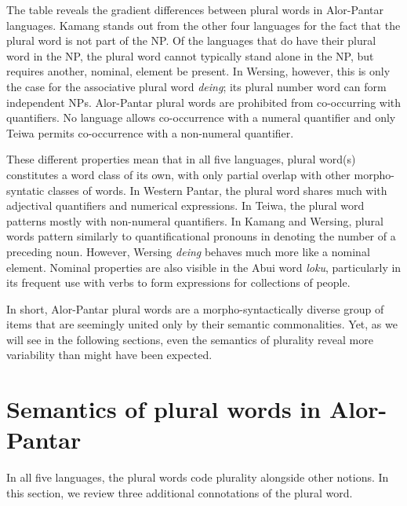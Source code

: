 The table reveals the gradient differences between plural words in Alor-Pantar languages. Kamang stands out from the other four languages for the fact that the plural word is not part of the NP. Of the languages that do have their plural word in the NP, the plural word cannot typically stand alone in the NP, but requires another, nominal, element be present. In Wersing, however, this is only the case for the associative plural word \textit{deing}; its plural number word can form independent NPs. Alor-Pantar plural words are prohibited from co-occurring with quantifiers. No language allows co-occurrence with a numeral quantifier and only Teiwa permits co-occurrence with a non-numeral quantifier.

 These different properties mean that in all five languages, plural word(s) constitutes a word class of its own, with only partial overlap with other morpho-syntatic classes of words. In Western Pantar, the plural word shares much with adjectival quantifiers and numerical expressions. In Teiwa, the plural word patterns mostly with non-numeral quantifiers. In Kamang and Wersing, plural words pattern similarly to quantificational pronouns in denoting the number of a preceding noun. However, Wersing \textit{deing} behaves much more like a nominal element. Nominal properties are also visible in the Abui word \textit{loku}, particularly in its frequent use with verbs to form expressions for collections of people.

 In short, Alor-Pantar plural words are a morpho-syntactically diverse group of items that are seemingly united only by their semantic commonalities. Yet, as we will see in the following sections, even the semantics of plurality reveal more variability than might have been expected.

\section{Semantics of plural words in Alor-Pantar}  %
\label{sec:9:4}
In all five languages, the plural words code plurality alongside other notions. In this section, we review three additional connotations of the plural word.

